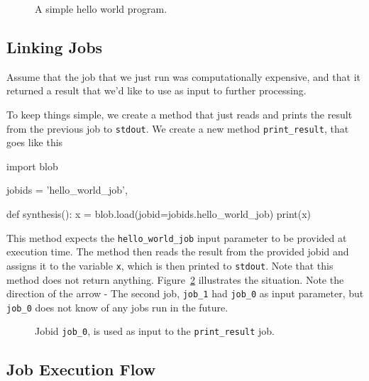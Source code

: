 \documentclass[a4paper]{article}
\begin{document}
\begin{figure}[h!]
  \begin{center}
    
    \caption{A simple hello world program.}
    \label{fig:execflow-hello-world}
  \end{center}
\end{figure}

\clearpage





\subsection{Linking Jobs}
Assume that the job that we just run was computationally expensive,
and that it returned a result that we'd like to use as input to further
processing.

To keep things simple, we create a method that just reads and prints
the result from the previous job to \texttt{stdout}.  We create a new
method \texttt{print\_result}, that goes like this

\begin{python}
import blob
  
jobids = {'hello_world_job',}

def synthesis():
    x = blob.load(jobid=jobids.hello_world_job)
    print(x)
\end{python}

This method expects the \texttt{hello\_world\_job} input parameter to
be provided at execution time.  The method then reads the result from
the provided jobid and assigns it to the variable \texttt{x}, which is
then printed to \texttt{stdout}.  Note that this method does not
return anything.  Figure~\ref{fig:execflow-print-result} illustrates
the situation.  Note the direction of the arrow - The second job,
\texttt{job\_1} had \texttt{job\_0} as input parameter, but
\texttt{job\_0} does not know of any jobs run in the future.

\begin{figure}[h!]
  \begin{center}
    
    \caption{Jobid \texttt{job\_0}, is used as input to the
      \texttt{print\_result} job.}
    \label{fig:execflow-print-result}
  \end{center}
\end{figure}

\clearpage




\subsection{Job Execution Flow}
\end{document}
